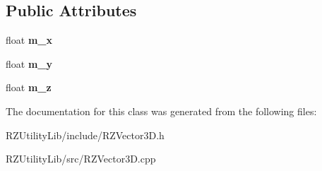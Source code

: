 \subsection*{Public Attributes}
\begin{DoxyCompactItemize}
\item 
\hypertarget{classrcz_engine_1_1_vector3_a5fc9f536124708099385641616d375b9}{}float {\bfseries m\+\_\+x}\label{classrcz_engine_1_1_vector3_a5fc9f536124708099385641616d375b9}

\item 
\hypertarget{classrcz_engine_1_1_vector3_a44e9053aeadbd5d87a15739dfd989336}{}float {\bfseries m\+\_\+y}\label{classrcz_engine_1_1_vector3_a44e9053aeadbd5d87a15739dfd989336}

\item 
\hypertarget{classrcz_engine_1_1_vector3_a021aaba1be9fcf7b1447453e51861562}{}float {\bfseries m\+\_\+z}\label{classrcz_engine_1_1_vector3_a021aaba1be9fcf7b1447453e51861562}

\end{DoxyCompactItemize}


The documentation for this class was generated from the following files\+:\begin{DoxyCompactItemize}
\item 
R\+Z\+Utility\+Lib/include/R\+Z\+Vector3\+D.\+h\item 
R\+Z\+Utility\+Lib/src/R\+Z\+Vector3\+D.\+cpp\end{DoxyCompactItemize}
